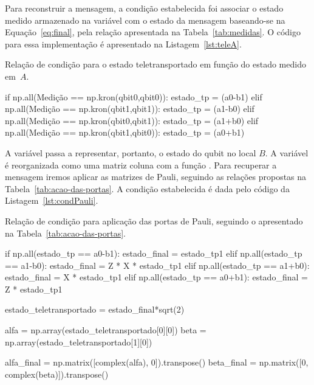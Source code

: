 
Para reconstruir a mensagem, a condição estabelecida foi associar o estado medido armazenado na variável  com o estado da mensagem baseando-se na Equação~\eqref{eq:final}, pela relação apresentada na Tabela~\ref{tab:medidas}. O código para essa implementação é apresentado na Listagem~\ref{lst:teleA}.

\begin{listing}[ht!]
  \caption{Relação de condição para o estado teletransportado em função do estado medido em~\(A\).}\label{lst:teleA}
  \begin{pycode}
  if np.all(Medição == np.kron(qbit0,qbit0)):
      estado_tp = (a0-b1)
  elif np.all(Medição == np.kron(qbit1,qbit1)):
      estado_tp = (a1-b0)
  elif np.all(Medição == np.kron(qbit0,qbit1)):
      estado_tp = (a1+b0)
  elif np.all(Medição == np.kron(qbit1,qbit0)):
      estado_tp = (a0+b1)
  \end{pycode}
\end{listing}

A variável  passa a representar, portanto, o estado do qubit no local \(B\). A variável é reorganizada como uma matriz coluna com a função . Para recuperar a mensagem iremos aplicar as matrizes de Pauli, seguindo as relações propostas na Tabela~\ref{tab:acao-das-portas}. A condição estabelecida é dada pelo código da Listagem~\ref{lst:condPauli}.

\begin{listing}[ht!]
  \caption{Relação de condição para aplicação das portas de Pauli, seguindo o apresentado na Tabela~\ref{tab:acao-das-portas}.}\label{lst:condPauli}
  \begin{pycode}
    if np.all(estado_tp == a0-b1):
        estado_final = estado_tp1
    elif np.all(estado_tp == a1-b0):
        estado_final = Z * X * estado_tp1
    elif np.all(estado_tp == a1+b0):
        estado_final = X * estado_tp1
    elif np.all(estado_tp == a0+b1):
        estado_final = Z * estado_tp1

    estado_teletransportado = estado_final*sqrt(2)

    alfa = np.array(estado_teletransportado[0][0])
    beta = np.array(estado_teletransportado[1][0])

    alfa_final = np.matrix([complex(alfa), 0]).transpose()
    beta_final = np.matrix([0, complex(beta)]).transpose()
  \end{pycode}
\end{listing}

